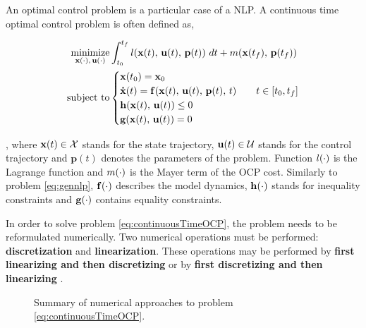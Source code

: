 An optimal control problem is a particular case of a NLP. A continuous time optimal control problem \cite{diehlnumericalocp} is often defined as,

\begin{subequations}
	\begin{align}
		\underset{\mathbf{x}(\cdot),\,\mathbf{u}(\cdot)}{\text{minimize}} &\int_{t_0}^{t_f} l(\mathbf{x}(t),\, \mathbf{u}(t),\, \mathbf{p}(t))\ dt + m(\mathbf{x}(t_f),\, \mathbf{p}(t_f))\\
		\text{subject to}&
		\begin{cases}
			\mathbf{x}(t_0) =\mathbf{x}_0\\
			\mathbf{\dot{x}}(t) = \mathbf{f}(\mathbf{x}(t),\,\mathbf{u}(t),\, \mathbf{p}(t),\,t) \quad & t \in [t_0, t_f]\\
			\mathbf{h}(\mathbf{x}(t),\,\mathbf{u}(t)) \leq 0\\
			\mathbf{g}(\mathbf{x}(t),\,\mathbf{u}(t)) = 0
		\end{cases}
	\end{align}
	\label{eq:continuousTimeOCP}
\end{subequations}

\noindent , where $\mathbf{x}(t) \in \mathcal{X}$ stands for the state trajectory, $\mathbf{u}(t) \in \mathcal{U}$ stands for the control trajectory and $\mathbf{p}(t)$ denotes the parameters of the problem. Function $l(\cdot)$ is the Lagrange function and $m(\cdot)$ is the Mayer term of the OCP cost. Similarly to problem \eqref{eq:gennlp}, $\mathbf{f}(\cdot)$ describes the model dynamics,  $\mathbf{h}(\cdot)$ stands for inequality constraints and $\mathbf{g}(\cdot)$ contains equality constraints.

In order to solve problem \eqref{eq:continuousTimeOCP}, the problem needs to be reformulated numerically. Two numerical operations must be performed: \textbf{discretization} and \textbf{linearization}. These operations may be performed by \textbf{first linearizing and then discretizing} or by \textbf{first discretizing and then linearizing} \cite{gros2020linear}.

\begin{figure}[h]
\centering
{}
\caption{Summary of numerical approaches to problem \eqref{eq:continuousTimeOCP}.}
\label{fig:summarynumapproaches}
\end{figure}

